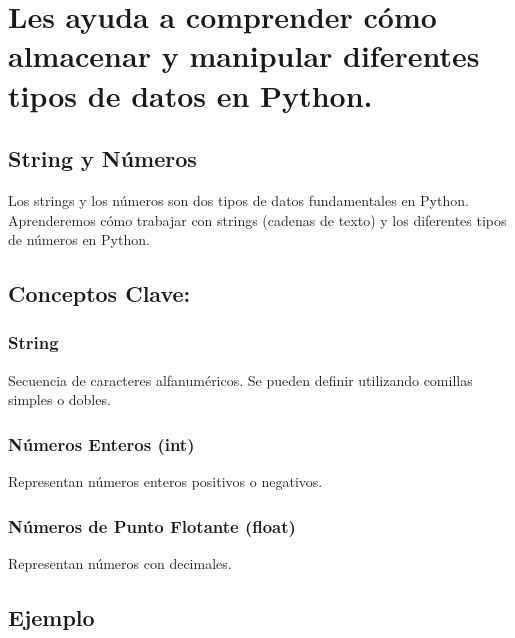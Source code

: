 \documentclass[
  a4paper,
  onepage,
  openany]{scrreprt}
\begin{document}
\hypertarget{les-ayuda-a-comprender-cuxf3mo-almacenar-y-manipular-diferentes-tipos-de-datos-en-python.}{%
\chapter{Les ayuda a comprender cómo almacenar y manipular diferentes
tipos de datos en
Python.}\label{les-ayuda-a-comprender-cuxf3mo-almacenar-y-manipular-diferentes-tipos-de-datos-en-python.}}

\hypertarget{string-y-nuxfameros-1}{%
\section{String y Números}\label{string-y-nuxfameros-1}}

Los strings y los números son dos tipos de datos fundamentales en
Python. Aprenderemos cómo trabajar con strings (cadenas de texto) y los
diferentes tipos de números en Python.

\hypertarget{conceptos-clave-17}{%
\section{Conceptos Clave:}\label{conceptos-clave-17}}

\hypertarget{string-1}{%
\subsection{String}\label{string-1}}

Secuencia de caracteres alfanuméricos. Se pueden definir utilizando
comillas simples o dobles.

\hypertarget{nuxfameros-enteros-int-1}{%
\subsection{Números Enteros (int)}\label{nuxfameros-enteros-int-1}}

Representan números enteros positivos o negativos.

\hypertarget{nuxfameros-de-punto-flotante-float-1}{%
\subsection{Números de Punto Flotante
(float)}\label{nuxfameros-de-punto-flotante-float-1}}

Representan números con decimales.

\hypertarget{ejemplo-17}{%
\section{Ejemplo}\label{ejemplo-17}}
\end{document}
